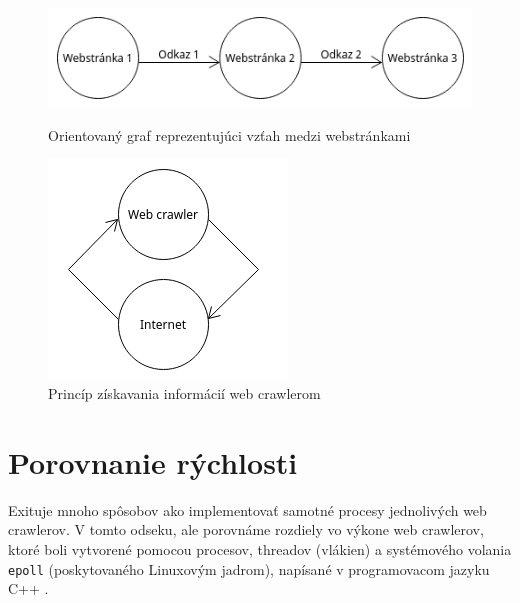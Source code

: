 \documentclass[10pt,twocolumn,twoside,slovak,a4paper]{article}
\begin{document}
\begin{figure}
	\centering
	\begin{minipage}{0.4\textwidth}
		\includegraphics[width=\textwidth]{diagram1.png}
		\caption{Orientovaný graf reprezentujúci vzťah medzi webstránkami}
	\end{minipage}
	\begin{minipage}{0.4\textwidth}
		\includegraphics[width=\textwidth]{diagram2.png}
		\caption{Princíp získavania informácií web crawlerom \cite{sharma2011novel}}
	\end{minipage}
\end{figure}

\section{Porovnanie rýchlosti}
Exituje mnoho spôsobov ako implementovať samotné procesy jednolivých web crawlerov. V tomto odseku, ale porovnáme rozdiely vo výkone web crawlerov, ktoré boli vytvorené pomocou procesov, threadov (vlákien) a systémového volania \texttt{epoll} (poskytovaného Linuxovým jadrom), napísané v programovacom jazyku C++ \cite{9648837}. \\
\end{document}
